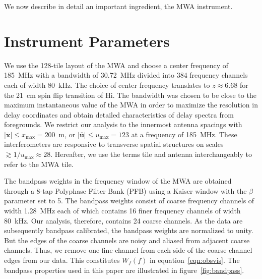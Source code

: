 \documentclass[preprint2,iop,numberedappendix]{emulateapj}
\begin{document}
We now describe in detail an important ingredient, the MWA instrument.

\section{Instrument Parameters}\label{sec:instrument}

We use the 128-tile layout of the MWA \citep{bea12} and choose a center frequency of 185~MHz with a bandwidth of 30.72~MHz divided into 384 frequency channels each of width 80~kHz. The choice of center frequency translates to $z\approx 6.68$ for the 21~cm spin flip transition of H{\sc i}. The bandwidth was chosen to be close to the maximum instantaneous value of the MWA in order to maximize the resolution in delay coordinates and obtain detailed characteristics of delay spectra from foregrounds. We restrict our analysis to the innermost antenna spacings with $|\overline{\mathbf{x}}| \leq x_\textrm{max} = 200$~m, or $|\overline{\mathbf{u}}| \leq u_\textrm{max} = 123$ at a frequency of 185~MHz. These interferometers are responsive to transverse spatial structures on scales $\gtrsim 1/u_\textrm{max} \approx 28$\arcmin. Hereafter, we use the terms tile and antenna interchangeably to refer to the MWA tile. 

The bandpass weights in the frequency window of the MWA are obtained through a 8-tap Polyphase Filter Bank (PFB) using a Kaiser window with the $\beta$ parameter set to 5. The bandpass weights consist of coarse frequency channels of width 1.28~MHz each of which contains 16 finer frequency channels of width 80~kHz. Our analysis, therefore, contains 24 coarse channels. As the data are subsequently bandpass calibrated, the bandpass weights are normalized to unity. But the edges of the coarse channels are noisy and aliased from adjacent coarse channels. Thus, we remove one fine channel from each side of the coarse channel edges from our data. This constitutes $W_f(f)$ in equation~\ref{eqn:obsvis}. The bandpass properties used in this paper are illustrated in figure~\ref{fig:bandpass}. 
\end{document}
